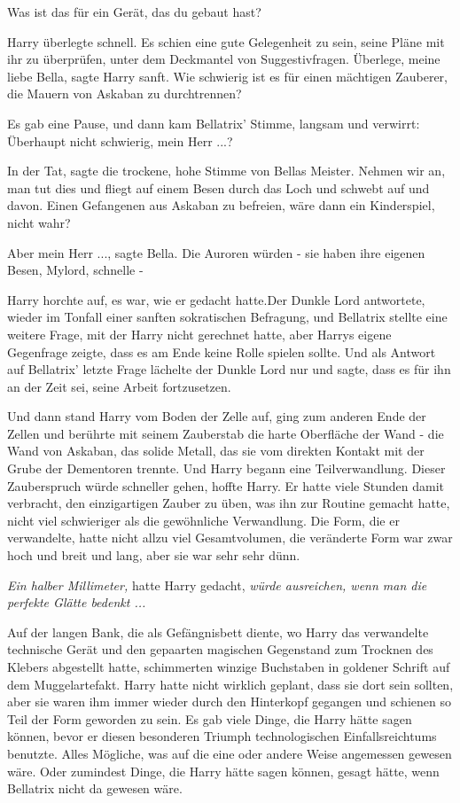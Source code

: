 \glqq{}Was ist das für ein Gerät, das du gebaut hast?\grqq{}

Harry überlegte schnell. Es schien eine gute Gelegenheit zu sein, seine Pläne
mit ihr zu überprüfen, unter dem Deckmantel von Suggestivfragen. \glqq{}Überlege,
meine liebe Bella\grqq{}, sagte Harry sanft. \glqq{}Wie schwierig ist es für
einen mächtigen Zauberer, die Mauern von Askaban zu durchtrennen?\grqq{}

Es gab eine Pause, und dann kam Bellatrix' Stimme, langsam und verwirrt: \glqq{}
Überhaupt nicht schwierig, mein Herr ...?\grqq{}

\glqq{}In der Tat\grqq{}, sagte die trockene, hohe Stimme von Bellas Meister.
\glqq{}Nehmen wir an, man tut dies und fliegt auf einem Besen durch das Loch und
schwebt auf und davon. Einen Gefangenen aus Askaban zu befreien, wäre dann ein
Kinderspiel, nicht wahr?\grqq{}

\glqq{}Aber mein Herr ...\grqq{}, sagte Bella. \glqq{}Die Auroren würden - sie
haben ihre eigenen Besen, Mylord, schnelle -\grqq{}

Harry horchte auf, es war, wie er gedacht hatte.Der Dunkle Lord antwortete,
wieder im Tonfall einer sanften sokratischen Befragung, und Bellatrix stellte
eine weitere Frage, mit der Harry nicht gerechnet hatte, aber Harrys eigene
Gegenfrage zeigte, dass es am Ende keine Rolle spielen sollte. Und als Antwort
auf Bellatrix' letzte Frage lächelte der Dunkle Lord nur und sagte, dass es für
ihn an der Zeit sei, seine Arbeit fortzusetzen.

Und dann stand Harry vom Boden der Zelle auf, ging zum anderen Ende der Zellen
und berührte mit seinem Zauberstab die harte Oberfläche der Wand - die Wand von
Askaban, das solide Metall, das sie vom direkten Kontakt mit der Grube der
Dementoren trennte. Und Harry begann eine Teilverwandlung. Dieser Zauberspruch
würde schneller gehen, hoffte Harry. Er hatte viele Stunden damit verbracht, den
einzigartigen Zauber zu üben, was ihn zur Routine gemacht hatte, nicht viel
schwieriger als die gewöhnliche Verwandlung. Die Form, die er verwandelte, hatte
nicht allzu viel Gesamtvolumen, die veränderte Form war zwar hoch und breit und
lang, aber sie war sehr sehr dünn.

\emph{Ein halber Millimeter,} hatte Harry gedacht, \emph{würde ausreichen, wenn
man die perfekte Glätte bedenkt ...}

Auf der langen Bank, die als Gefängnisbett diente, wo Harry das verwandelte
technische Gerät und den gepaarten magischen Gegenstand zum Trocknen des Klebers
abgestellt hatte, schimmerten winzige Buchstaben in goldener Schrift auf dem
Muggelartefakt. Harry hatte nicht wirklich geplant, dass sie dort sein sollten,
aber sie waren ihm immer wieder durch den Hinterkopf gegangen und schienen so
Teil der Form geworden zu sein. Es gab viele Dinge, die Harry hätte sagen
können, bevor er diesen besonderen Triumph technologischen Einfallsreichtums
benutzte. Alles Mögliche, was auf die eine oder andere Weise angemessen gewesen
wäre. Oder zumindest Dinge, die Harry hätte sagen können, gesagt hätte, wenn
Bellatrix nicht da gewesen wäre.

